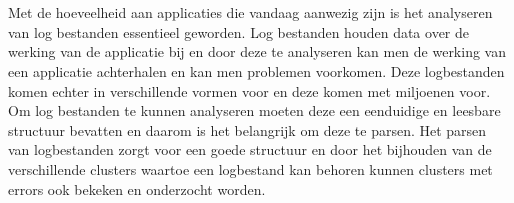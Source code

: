 
%
%

%



\chapter*{}

Met de hoeveelheid aan applicaties die vandaag aanwezig zijn is het analyseren van log bestanden essentieel geworden. Log bestanden houden data over de werking van de applicatie bij en door deze te analyseren kan men de werking van een applicatie achterhalen en kan men problemen voorkomen. Deze logbestanden komen echter in verschillende vormen voor en deze komen met miljoenen voor. Om log bestanden te kunnen analyseren moeten deze een eenduidige en leesbare structuur bevatten en daarom is het belangrijk om deze te parsen. Het parsen van logbestanden zorgt voor een goede structuur en door het bijhouden van de verschillende clusters waartoe een logbestand kan behoren kunnen clusters met errors ook bekeken en onderzocht worden.\\


